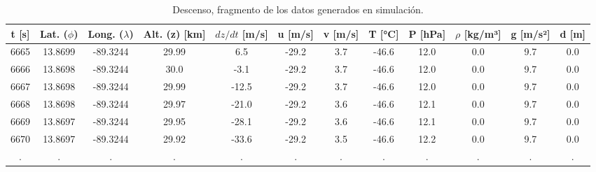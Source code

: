 \begin{table}
\footnotesize
\centering
\caption{Descenso, fragmento de los datos generados en simulación.}
\label{tab:descenso_frag_datos_generados}
\begin{tabular}{cccccccccccc}
\toprule
\textbf{t [s]} & \textbf{Lat. ($\phi$)} & \textbf{Long. ($\lambda$)} & \textbf{Alt. (z) [km]} & \textbf{$dz/dt$ [m/s]} & \textbf{u [m/s]} & \textbf{v [m/s]} & \textbf{T [°C]} & \textbf{P [hPa]} & \textbf{$\rho$ [kg/m³]} & \textbf{g [m/s²]} & \textbf{d [m]} \\
\midrule
          6665 &                13.8699 &                   -89.3244 &                  29.99 &                    6.5 &            -29.2 &              3.7 &           -46.6 &             12.0 &                     0.0 &               9.7 &            0.0 \\
          6666 &                13.8698 &                   -89.3244 &                   30.0 &                   -3.1 &            -29.2 &              3.7 &           -46.6 &             12.0 &                     0.0 &               9.7 &            0.0 \\
          6667 &                13.8698 &                   -89.3244 &                  29.99 &                  -12.5 &            -29.2 &              3.7 &           -46.6 &             12.0 &                     0.0 &               9.7 &            0.0 \\
          6668 &                13.8698 &                   -89.3244 &                  29.97 &                  -21.0 &            -29.2 &              3.6 &           -46.6 &             12.1 &                     0.0 &               9.7 &            0.0 \\
          6669 &                13.8697 &                   -89.3244 &                  29.95 &                  -28.1 &            -29.2 &              3.6 &           -46.6 &             12.1 &                     0.0 &               9.7 &            0.0 \\
          6670 &                13.8697 &                   -89.3244 &                  29.92 &                  -33.6 &            -29.2 &              3.5 &           -46.6 &             12.2 &                     0.0 &               9.7 &            0.0 \\
             . &                      . &                          . &                      . &                      . &                . &                . &               . &                . &                       . &                 . &              . \\

\end{tabular}
\end{table}
